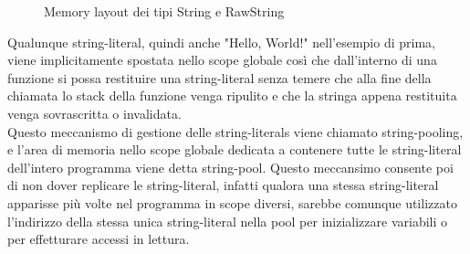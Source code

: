 \begin{figure}[htbp]
    \centering
    \caption{Memory layout dei tipi String e RawString}
    \label{fig:string_mem_layout}
\end{figure}
\newpage


Qualunque string-literal, quindi anche "Hello, World!" nell’esempio di prima, viene implicitamente spostata 
nello scope globale così che dall’interno di una funzione si possa restituire una string-literal senza temere 
che alla fine della chiamata lo stack della funzione venga ripulito e che la stringa appena restituita venga 
sovrascritta o invalidata. \\

Questo meccanismo di gestione delle string-literals viene chiamato string-pooling, e l’area di memoria 
nello scope globale dedicata a contenere tutte le string-literal dell’intero programma viene detta string-pool. Questo 
meccansimo consente poi di non dover replicare le string-literal, infatti qualora una stessa string-literal apparisse 
più volte nel programma in scope diversi, sarebbe comunque utilizzato l’indirizzo della stessa unica string-literal 
nella pool per inizializzare variabili o per effetturare accessi in lettura. \\

